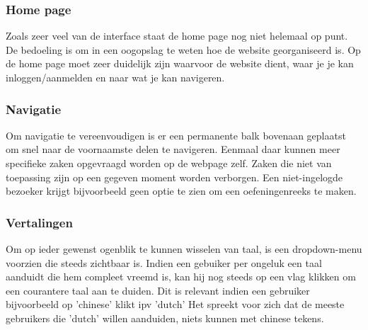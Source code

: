\subsubsection{Home page}
Zoals zeer veel van de interface staat de home page nog niet helemaal op punt. De bedoeling is om
in een oogopslag te weten hoe de website georganiseerd is. Op de home page moet zeer duidelijk
zijn waarvoor de website dient, waar je je kan inloggen/aanmelden en naar wat je kan navigeren.

\subsubsection{Navigatie}
Om navigatie te vereenvoudigen is er een permanente balk bovenaan geplaatst om snel naar de voornaamste
delen te navigeren. Eenmaal daar kunnen meer specifieke zaken opgevraagd worden op de webpage zelf.
Zaken die niet van toepassing zijn op een gegeven moment worden verborgen. Een niet-ingelogde bezoeker
krijgt bijvoorbeeld geen optie te zien om een oefeningenreeks te maken.

\subsubsection{Vertalingen}
Om op ieder gewenst ogenblik te kunnen wisselen van taal, is een dropdown-menu voorzien die steeds zichtbaar is.
Indien een gebuiker per ongeluk een taal aanduidt die hem compleet vreemd is, kan hij nog steeds op een vlag klikken
om een courantere taal aan te duiden. Dit is relevant indien een gebruiker bijvoorbeeld op 'chinese' klikt ipv 'dutch'
Het spreekt voor zich dat de meeste gebruikers die 'dutch' willen aanduiden, niets kunnen met chinese tekens.
